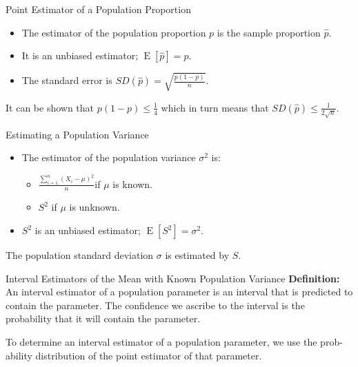 \documentclass{beamer}
\newcommand{\E}[1]{\operatorname{E}\left[#1\right]}
\begin{document}
\begin{frame}{Point Estimator of a Population Proportion}
  \begin{itemize}
  \item The estimator of the population proportion $p$ is the sample proportion
    $\hat{p}$.
  \item It is an unbiased estimator; $\E{\hat{p}}=p$.
  \item The standard error is $SD(\hat{p})=\sqrt{\frac{p(1-p)}{n}}$.
  \end{itemize}

  It can be shown that $p(1-p)\leq\frac{1}{4}$ which in turn means that
  $SD(\hat{p}) \leq \frac{1}{2\sqrt{n}}$.
\end{frame}

\begin{frame}{Estimating a Population Variance}
  \begin{itemize}
  \item The estimator of the population variance $\sigma^2$ is:
    \begin{itemize}
    \item $\frac{\sum_{i=1}^n (X_i-\mu)^2}{n}$if $\mu$ is known.
    \item $S^2$ if $\mu$ is unknown.
    \end{itemize}
  \item $S^2$ is an unbiased estimator; $\E{S^2}=\sigma^2$.
  \end{itemize}

  The population standard deviation $\sigma$ is estimated by $S$.
\end{frame}

\begin{frame}{Interval Estimators of the Mean with Known
    Population Variance}
  \textbf{Definition: }An \alert{interval estimator} of a population parameter
  is an interval that is predicted to contain the parameter. The
  \alert{confidence} we ascribe to the interval is the probability that it will
  contain the parameter.

  To determine an interval estimator of a population parameter, we use the prob-
  ability distribution of the point estimator of that parameter.
\end{frame}
\end{document}

